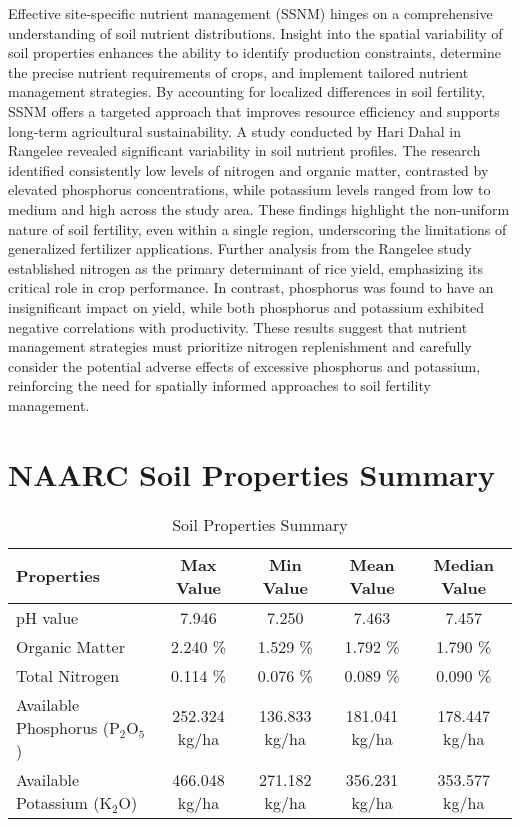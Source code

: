\documentclass[a4paper,12pt]{article}
\begin{document}
Effective site-specific nutrient management (SSNM) hinges on a comprehensive understanding of soil nutrient distributions. Insight into the spatial variability of soil properties enhances the ability to identify production constraints, determine the precise nutrient requirements of crops, and implement tailored nutrient management strategies. By accounting for localized differences in soil fertility, SSNM offers a targeted approach that improves resource efficiency and supports long-term agricultural sustainability.
A study conducted by Hari Dahal in Rangelee revealed significant variability in soil nutrient profiles. The research identified consistently low levels of nitrogen and organic matter, contrasted by elevated phosphorus concentrations, while potassium levels ranged from low to medium and high across the study area. These findings highlight the non-uniform nature of soil fertility, even within a single region, underscoring the limitations of generalized fertilizer applications.
Further analysis from the Rangelee study established nitrogen as the primary determinant of rice yield, emphasizing its critical role in crop performance. In contrast, phosphorus was found to have an insignificant impact on yield, while both phosphorus and potassium exhibited negative correlations with productivity. These results suggest that nutrient management strategies must prioritize nitrogen replenishment and carefully consider the potential adverse effects of excessive phosphorus and potassium, reinforcing the need for spatially informed approaches to soil fertility management.




\section{NAARC Soil Properties Summary}
\parencite{narc_soil_data}
\begin{table}[h]
    \centering
    \begin{tabular}{|l|c|c|c|c|}
    \hline
    \textbf{Properties}                  & \textbf{Max Value} & \textbf{Min Value} & \textbf{Mean Value} & \textbf{Median Value} \\ \hline
    pH value                             & 7.946             & 7.250             & 7.463              & 7.457                \\ \hline
    Organic Matter                       & 2.240 \%          & 1.529 \%          & 1.792 \%           & 1.790 \%             \\ \hline
    Total Nitrogen                       & 0.114 \%          & 0.076 \%          & 0.089 \%           & 0.090 \%             \\ \hline
    Available Phosphorus (P$_2$O$_5$)    & 252.324 kg/ha     & 136.833 kg/ha     & 181.041 kg/ha      & 178.447 kg/ha        \\ \hline
    Available Potassium (K$_2$O)         & 466.048 kg/ha     & 271.182 kg/ha     & 356.231 kg/ha      & 353.577 kg/ha        \\ \hline
    \end{tabular}
    \caption{Soil Properties Summary}
    \label{tab:soil_properties}
    \end{table}
\end{document}
